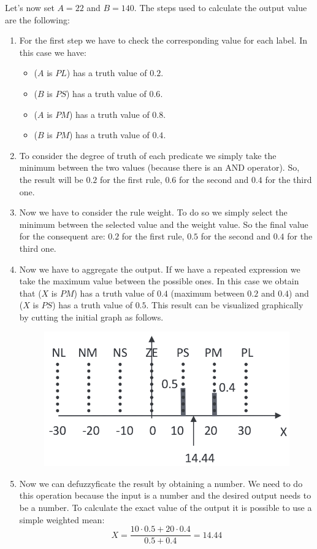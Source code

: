 \documentclass[12pt, a4paper]{report}
\newtheorem[style=M,bodystyle=\normalfont]{theorem}{Theorem}
\newtheorem[style=M,bodystyle=\normalfont]{corollary}{Corollary}
\newtheorem[style=M,bodystyle=\normalfont]{lemma}{Lemma}
\newtheorem[style=M,bodystyle=\normalfont]{definition}{Definition}
\begin{document}
\begin{example}
        Let's now set $A=22$ and $B=140$. The steps used to calculate the output value are the following:
        \begin{enumerate}
            \item For the first step we have to check the corresponding value for each label. In this case we have:
                \begin{itemize}
                    \item ($A$ is $PL$) has a truth value of $0.2$.
                    \item ($B$ is $PS$) has a truth value of $0.6$.
                    \item ($A$ is $PM$) has a truth value of $0.8$.
                    \item ($B$ is $PM$) has a truth value of $0.4$.
                \end{itemize}
            \item To consider the degree of truth of each predicate we simply take the minimum between the two values (because there is an AND 
                operator). So, the result will be $0.2$ for the first rule, $0.6$ for the second and $0.4$ for the third one.
            \item Now we have to consider the rule weight. To do so we simply select the minimum between the selected value and the weight value.
                So the final value for the consequent are: $0.2$ for the first rule, $0.5$ for the second and $0.4$ for the third one. 
            \item  Now we have to aggregate the output. If we have a repeated expression we take the maximum value between the possible ones. 
                In this case we obtain that ($X$ is $PM$) has a truth value of $0.4$ (maximum between $0.2$ and $0.4$) and ($X$ is $PS$) has a 
                truth value of $0.5$. This result can be visualized graphically by cutting the initial graph as follows.
                \begin{figure}[H]
                    \centering
                    \includegraphics[width=0.5\linewidth]{images/cut.png}
                \end{figure}
            \item Now we can defuzzyficate the result by obtaining a number. We need to do this operation because the input is a number and the 
            desired output needs to be a number. To calculate the exact value of the output it is possible to use a simple weighted mean: 
            \[X=\frac{10 \cdot 0.5 + 20 \cdot 0.4}{0.5+0.4}=14.44\]
        \end{enumerate}
    \end{example}
\end{document}
